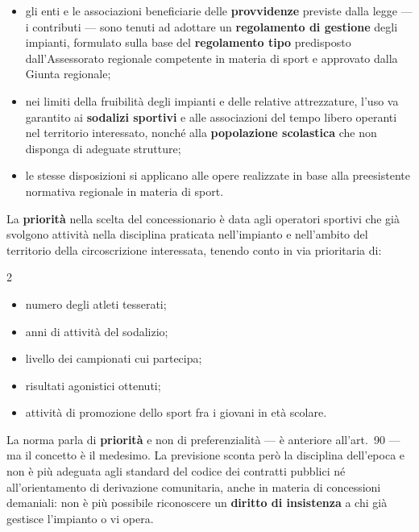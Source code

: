 
\begin{itemize}
  \item gli enti e le associazioni beneficiarie delle \textbf{provvidenze} previste dalla legge
    --- i contributi --- sono tenuti ad adottare un \textbf{regolamento di gestione} degli
    impianti, formulato sulla base del \textbf{regolamento tipo} predisposto dall'Assessorato
    regionale competente in materia di sport e approvato dalla Giunta regionale;
  \item nei limiti della fruibilità degli impianti e delle relative attrezzature, l'uso va
    garantito ai \textbf{sodalizi sportivi} e alle associazioni del tempo libero operanti nel
    territorio interessato, nonché alla \textbf{popolazione scolastica} che non disponga di
    adeguate strutture;
  \item le stesse disposizioni si applicano alle opere realizzate in base alla preesistente
    normativa regionale in materia di sport.
\end{itemize}


La \textbf{priorità} nella scelta del concessionario è data agli operatori sportivi che già
svolgono attività nella disciplina praticata nell'impianto e nell'ambito del territorio della
circoscrizione interessata, tenendo conto in via prioritaria di:

\begin{multicols}{2}
\begin{itemize}
  \item numero degli atleti tesserati;
  \item anni di attività del sodalizio;
  \item livello dei campionati cui partecipa;
  \item risultati agonistici ottenuti;
  \item attività di promozione dello sport fra i giovani in età scolare.
\end{itemize}
\end{multicols}

La norma parla di \textbf{priorità} e non di preferenzialità --- è anteriore all'art.\ 90 --- ma il
concetto è il medesimo. La previsione sconta però la disciplina dell'epoca e non è più adeguata
agli standard del codice dei contratti pubblici né all'orientamento di derivazione comunitaria,
anche in materia di concessioni demaniali: non è più possibile riconoscere un \textbf{diritto di
insistenza} a chi già gestisce l'impianto o vi opera.

